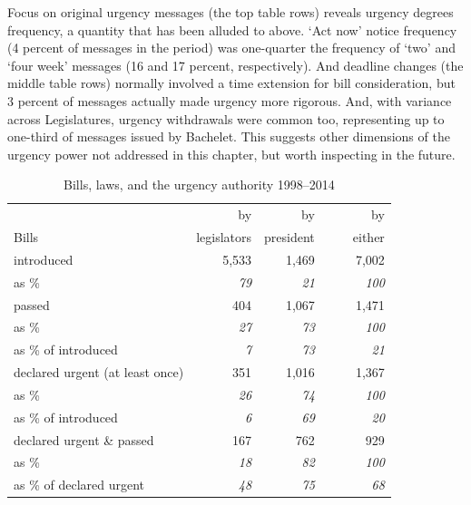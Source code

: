 \documentclass[letter,12pt]{article}
\begin{document}
Focus on original urgency messages (the top table rows) reveals urgency degrees frequency, a quantity that has been alluded to above. `Act now' notice frequency (4 percent of messages in the period) was one-quarter the frequency of `two' and `four week' messages (16 and 17 percent, respectively). And deadline changes (the middle table rows) normally involved a time extension for bill consideration, but 3 percent of messages actually made urgency more rigorous. And, with variance across Legislatures, urgency withdrawals were common too, representing up to one-third of messages issued by Bachelet. This suggests other dimensions of the urgency power not addressed in this chapter, but worth inspecting in the future. 

\begin{table}
\centering
\begin{tabular}{lrrr}
                                &  by           &  by          &    by      \\
Bills                           &  legislators  &  president   &    ~~~~either  \\ \hline
introduced                      &        5,533  &       1,469  &     7,002  \\
as \%                           &    \emph{79}  &   \emph{21}  & \emph{100} \\ \hdashline
passed                          &          404  &       1,067  &     1,471  \\
as \%                           &    \emph{27}  &   \emph{73}  & \emph{100} \\
as \% of introduced             &     \emph{7}  &   \emph{73}  &  \emph{21} \\ \hdashline
declared urgent (at least once) &          351  &       1,016  &     1,367  \\
as \%                           &    \emph{26}  &   \emph{74}  & \emph{100} \\
as \% of introduced             &     \emph{6}  &   \emph{69}  &  \emph{20} \\ \hdashline
declared urgent \& passed       &          167  &         762  &       929  \\
as \%                           &    \emph{18}  &   \emph{82}  & \emph{100} \\
as \% of declared urgent        &    \emph{48}  &   \emph{75}  &  \emph{68} \\ \hline
\end{tabular}
\caption{Bills, laws, and the urgency authority 1998--2014}\label{T:billDescriptives}
\end{table}
\end{document}

